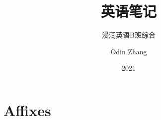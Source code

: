 \documentclass{mybook}
\title{英语笔记}
\subtitle{浸润英语B班综合}
\author{Odin Zhang}
\date{2021}
\begin{document}
\maketitle
\tableofcontents
\part{Affixes}

\end{document}
